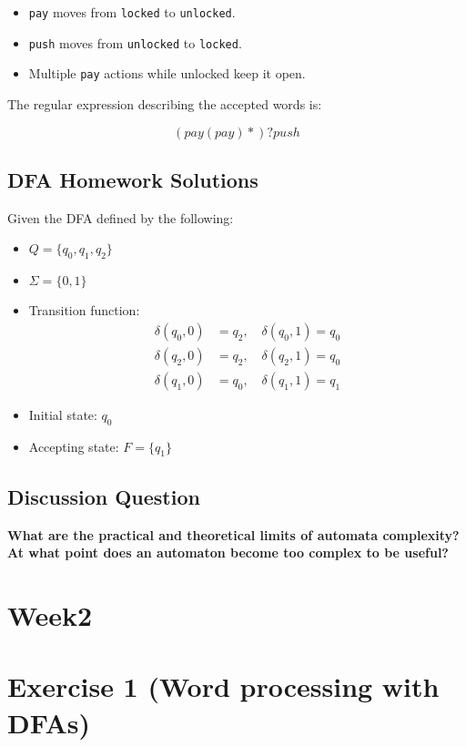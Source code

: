 \documentclass{article}
\begin{document}
\begin{itemize}
    \item \texttt{pay} moves from \texttt{locked} to \texttt{unlocked}.
    \item \texttt{push} moves from \texttt{unlocked} to \texttt{locked}.
    \item Multiple \texttt{pay} actions while unlocked keep it open.
\end{itemize}

The regular expression describing the accepted words is:

\begin{equation}
    (pay (pay)*)? push
\end{equation}

\subsection{DFA Homework Solutions}
Given the DFA defined by the following:
\begin{itemize}
    \item \( Q = \{ q_0, q_1, q_2 \} \)
    \item \( \Sigma = \{0,1\} \)
    \item Transition function:
    \begin{align*}
        \delta(q_0,0) &= q_2, \quad \delta(q_0,1) = q_0 \\
        \delta(q_2,0) &= q_2, \quad \delta(q_2,1) = q_0 \\
        \delta(q_1,0) &= q_0, \quad \delta(q_1,1) = q_1
    \end{align*}
    \item Initial state: \( q_0 \)
    \item Accepting state: \( F = \{ q_1 \} \)
\end{itemize}

\subsection{Discussion Question}
\textbf{What are the practical and theoretical limits of automata complexity? At what point does an automaton become too complex to be useful?}





\section{Week2}
\section*{Exercise 1 (Word processing with DFAs)}
\end{document}
